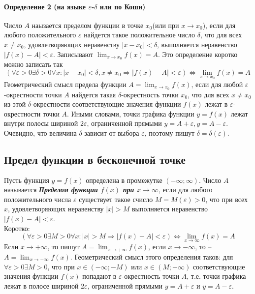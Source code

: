 \documentclass[12pt, fleqn]{article}
\begin{document}
	\paragraph{Определение 2 (на языке $\varepsilon$-$\delta$ или по Коши)}
	Число $A$ наызается пределом функции в точке $x_0$(или при $x \to x_0$), если для любого положительного $\varepsilon$ найдется такое положительное число $\delta$, что для всех $x \neq x_0$, удовлетворяющих неравенству $|x-x_0|<\delta$, выполняется неравенство $|f(x) - A| < \varepsilon$.
	Записывают $\lim_{x \to x_0} f(x) = A$. Это определение коротко можно записать так $$\left( \forall \varepsilon > 0 \exists \delta>0 \forall x \colon|x-x_0| < \delta, x \neq x_0 \Longrightarrow |f(x) - A| < \varepsilon \right) \Longleftrightarrow\lim_{x\to x_0}f(x) = A$$
	Геометрический смысл предела функции
	 $A=\lim_{x \to x_0}f(x)$, если для любой $\varepsilon$-окрестности точки $A$ найдется такая $\delta$-окрестность точки $x_0$, что для всех $x\neq x_0$ из этой $\delta$-окрестности соответствующие значения функции $f(x)$ лежат в $\varepsilon$- окрестности точки $A$. Иными словами, точки графика функции $y=f(x)$ лежат внутри полосы шириной $2\varepsilon$, ограниченной прямыми $y=A+\varepsilon, y=A-\varepsilon$. Очевидно, что величина $\delta$ зависит от выбора $\varepsilon$, поэтому пишут $\delta = \delta(\varepsilon).$
	\subsection{Предел функции в бесконечной точке}
	Пусть функция $y=f(x)$ определена в промежутке $(-\infty;\infty)$. Число $A$ называется \textbf{\textit{Пределом функции $f(x)$ при $x \to \infty$}}, если для любого положительного числа $\varepsilon$ существует такое счисло $M=M(\varepsilon) > 0$, что при всех $x$, удовлетворяющих неравенству $|x| > M$ выполняется неравенство $|f(x) - A| < \varepsilon$.\\ Коротко:
	$$\left( \forall\varepsilon>0\exists M>0 \forall x\colon |x|>M \Longrightarrow |f(x)-A| < \varepsilon \right) \Longleftrightarrow \lim_{x\to\infty}f(x)=A$$ 
	Если $x\to +\infty$, то пишут $A=\lim_{x\to+\infty}f(x)$, если $x \to -\infty$, то -- $A=\lim_{x\to-\infty}f(x).$ Геометрический смысл этого определения таков:
	для $\forall \varepsilon > 0 \exists M > 0$, что при $x\in \left(-\infty; -M\right)$ или $x \in \left(M;+\infty\right)$ соответствующие значения функции $f(x)$ попадают в $\varepsilon$-окрестность точки $A$, т.е. точки графика лежат в полосе шириной $2\varepsilon$, ограниченной прямыми $y=A+\varepsilon$ и $y=A-\varepsilon$.
\end{document}

